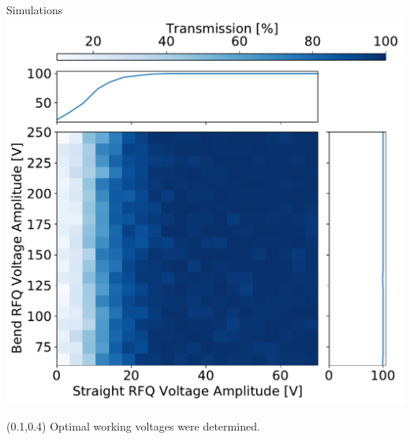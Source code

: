\documentclass{beamer}
\begin{document}
\begin{frame}{Simulations}
    \vspace*{2em}
    \flushright
    \includegraphics[scale=0.4]{assets/newgeo.pdf}

    \begin{textblock*}{0.2\paperwidth}(0.1\paperwidth,0.4\paperheight)
        \flushleft
        Optimal working voltages were determined. 
    \end{textblock*}
\end{frame}
\end{document}
